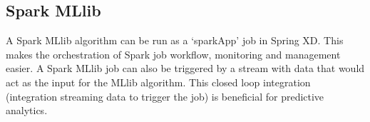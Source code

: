 \subsection{Spark MLlib}
A Spark MLlib algorithm can be run as a `sparkApp' job in Spring XD. This makes the
orchestration of Spark job workflow, monitoring and management easier.
A Spark MLlib job can also be triggered by a stream with data that
would act as the input for the MLlib algorithm. This closed loop
integration (integration streaming data to trigger the job) is
beneficial for predictive analytics.
